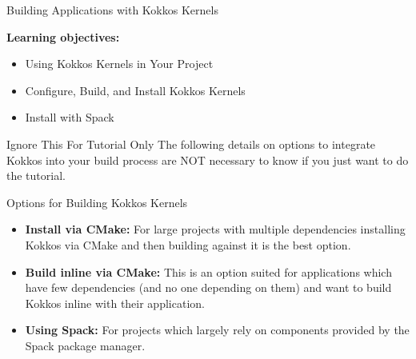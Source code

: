 



\begin{frame}[fragile]


  \vspace{10pt}
  {\Huge Building Applications with Kokkos Kernels}

  \vspace{10pt}

  \textbf{Learning objectives:}
  \begin{itemize}
    \item{Using Kokkos Kernels in Your Project}
    \item{Configure, Build, and Install Kokkos Kernels}
    \item{Install with Spack}
  \end{itemize}

  \pause

  \begin{block}{Ignore This For Tutorial Only}
     The following details on options to integrate Kokkos into your build process are NOT necessary to know if you just want to do the tutorial.
  \end{block}

\end{frame}

\begin{frame}[fragile]{Options for Building Kokkos Kernels}

\begin{itemize}
\item \textbf{Install via CMake:} For large projects with multiple dependencies installing Kokkos via CMake and then building against it is the best option.
\item \textbf{Build inline via CMake:} This is an option suited for applications which have few dependencies (and no one depending on them) and want to build Kokkos inline with their application.
\item \textbf{Using Spack:} For projects which largely rely on components provided by the Spack package manager.
\end{itemize}
\end{frame}

